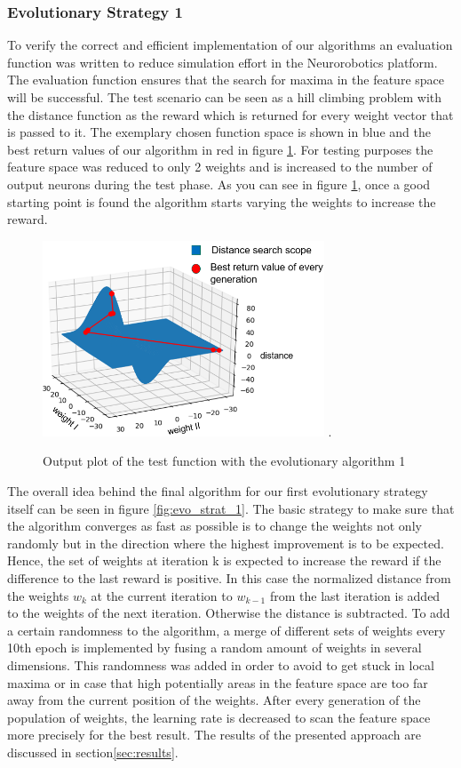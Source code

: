 \subsubsection{Evolutionary Strategy 1}
To verify the correct and efficient implementation of our algorithms an evaluation function was written to reduce simulation effort in the Neurorobotics platform. The evaluation function ensures that the search for maxima in the feature space will be successful. The test scenario can be seen as a hill climbing problem with the distance function as the reward which is returned for every weight vector that is passed to it. The exemplary chosen function space is shown in blue and the best return values of our algorithm in red in figure \ref{fig:test_function}. For testing purposes the feature space was reduced to only 2 weights and is increased to the number of output neurons during the test phase.
As you can see in figure \ref{fig:test_function}, once a good starting point is found the algorithm starts varying the weights to increase the reward. 


\begin{figure}[H]
	\centering
	\includegraphics[width=3.3in]{img/test_function.png}
	\DeclareGraphicsExtensions.
	\caption{Output plot of the test function with the evolutionary algorithm 1}
	\label{fig:test_function}
\end{figure}

The overall idea behind the final algorithm for our first evolutionary strategy itself can be seen in figure \ref{fig:evo_strat_1}. The basic strategy to make sure that the algorithm converges as fast as possible is to change the weights not only randomly but in the direction where the highest improvement is to be expected. Hence, the set of weights at iteration k is expected to increase the reward if the difference to the last reward is positive. In this case the normalized distance from the weights $w_k$  at the current iteration to $w_{k-1}$ from the last iteration is added to the weights of the next iteration. Otherwise the distance is subtracted. To add a certain randomness to the algorithm, a merge of different sets of weights every 10th epoch is implemented by fusing a random amount of weights in several dimensions. This randomness was added in order to avoid to get stuck in local maxima or in case that high potentially areas in the feature space are too far away from the current position of the weights. After every generation of the population of weights, the learning rate is decreased to scan the feature space more precisely for the best result. 
The results of the presented approach are discussed in section\ref{sec:results}.

